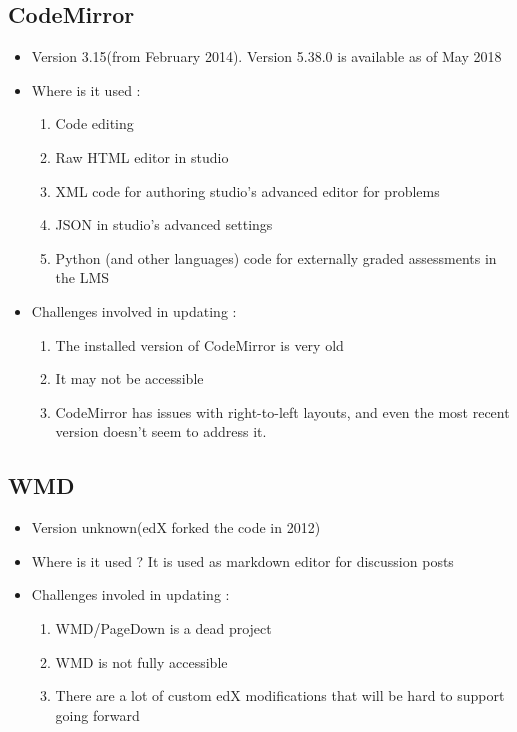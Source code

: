 \subsection{CodeMirror}
\begin{itemize}
	\item Version 3.15(from February 2014). Version 5.38.0 is available as of May 2018
	\item Where is it used :
		\begin{enumerate}
			\item Code editing
			\item Raw HTML editor in studio
			\item XML code for authoring studio's advanced editor for problems
			\item JSON in studio's advanced settings
			\item Python (and other languages) code for externally graded assessments in the LMS
		\end{enumerate}
	\item Challenges involved in updating :
		\begin{enumerate}
			\item The installed version of CodeMirror is very old
			\item It may not be accessible
			\item CodeMirror has issues with right-to-left layouts, and even the most recent version doesn't seem to address it.
		\end{enumerate}
\end{itemize}

\subsection{WMD}
\begin{itemize}
	\item Version unknown(edX forked the code in 2012)
	\item Where is it used ? It is used as markdown editor for discussion posts
	\item Challenges involed in updating :
		\begin{enumerate}
			\item WMD/PageDown is a dead project
			\item WMD is not fully accessible
			\item There are a lot of custom edX modifications that will be hard to support going forward
		\end{enumerate}
\end{itemize}

